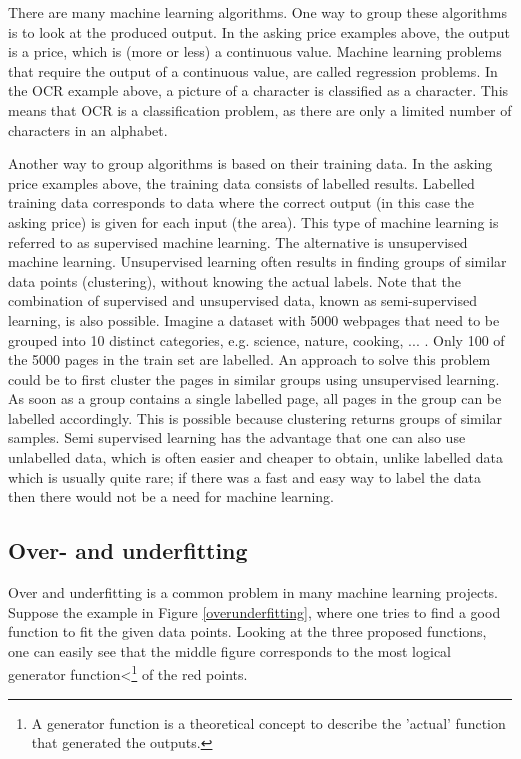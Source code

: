 \npar

There are many machine learning algorithms. One way to group these algorithms is to look at the produced output. In the asking price examples above, the output is a price, which is (more or less) a continuous value. Machine learning problems that require the output of a continuous value, are called regression problems\citep{prml}. In the OCR example above, a picture of a character is classified as a character. This means that OCR is a classification problem, as there are only a limited number of characters in an alphabet\citep{prml}.

\npar

Another way to group algorithms is based on their training data\citep{prml}. In the asking price examples above, the training data consists of labelled results. Labelled training data corresponds to data where the correct output (in this case the asking price) is given for each input (the area). This type of machine learning is referred to as supervised machine learning\citep{prml}. The alternative is unsupervised machine learning\citep{prml}. Unsupervised learning often results in finding groups of similar data points (clustering), without knowing the actual labels. Note that the combination of supervised and unsupervised data, known as semi-supervised learning, is also possible\citep{semiSup}. Imagine a dataset with 5000 webpages that need to be grouped into 10 distinct categories, e.g. science, nature, cooking, ... . Only 100 of the 5000 pages in the train set are labelled. An approach to solve this problem could be to first cluster the pages in similar groups using unsupervised learning. As soon as a group contains a single labelled page, all pages in the group can be labelled accordingly. This is possible because clustering returns groups of similar samples. Semi supervised learning has the advantage that one can also use unlabelled data, which is often easier and cheaper to obtain, unlike labelled data which is usually quite rare; if there was a fast and easy way to label the data then there would not be a need for machine learning.

\subsection{Over- and underfitting}

Over and underfitting is a common problem in many machine learning projects\citep{prml}. Suppose the example in Figure \ref{overunderfitting}, where one tries to find a good function to fit the given data points. Looking at the three proposed functions, one can easily see that the middle figure corresponds to the most logical generator function<\footnote{A generator function is a theoretical concept to describe the 'actual' function that generated the outputs.} of the red points.


